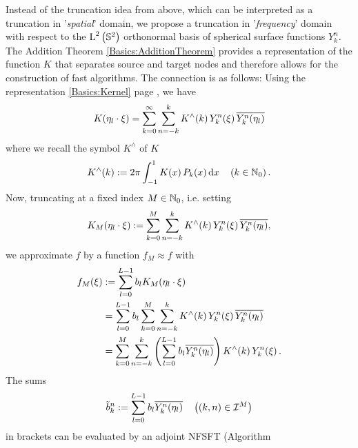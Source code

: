 Instead of the truncation idea from above, which can be interpreted as a truncation in 
'\emph{spatial}' domain, we propose a truncation in '\emph{frequency}' domain with respect 
to the $\text{\rm{L}}^{2}\left(\mathbb{S}^2\right)$ orthonormal basis  
of spherical surface functions $Y_{k}^n$. The Addition 
Theorem \ref{Basics:AdditionTheorem} provides a 
representation of the function $K$ that separates source and target nodes and 
therefore allows for the construction of fast algorithms. The connection is as 
follows: Using the representation \eqref{Basics:Kernel} page \pageref{Basics:Kernel}, we have
\begin{equation}
  \label{Applications:KSeries}
  K{\hspace{-0.4ex}}\left(\mathbf{\eta}_{l} \cdot \mathbf{\xi}\right) = \sum_{k=0}^{\infty} \sum_{n=-k}^k 
  K^{\wedge}{\hspace{-0.4ex}}\left(k\right)   Y_{k}^n{\hspace{-0.4ex}}\left(\mathbf{\xi}\right) \overline{Y_{k}^n{\hspace{-0.4ex}}\left(\mathbf{\eta}_{l}\right)}
\end{equation}
where we recall the symbol $K^{\wedge}$ of $K$
\[
  K^{\wedge}{\hspace{-0.4ex}}\left(k\right) := 2 \pi \int_{-1}^{1} K{\hspace{-0.4ex}}\left(x\right) P_{k}{\hspace{-0.4ex}}\left(x\right) \text{\rm{d}} x 
  \quad \left(k \in \mathbb{N}_{0}\right).
\]
Now, truncating at a fixed index $M \in \mathbb{N}_{0}$, i.e. setting
\begin{equation}
  \label{Applications:TruncatedSeries}
  K_{M}{\hspace{-0.4ex}}\left(\mathbf{\eta}_{l} \cdot \mathbf{\xi}\right) := 
  \sum_{k=0}^{M} \sum_{n=-k}^k K^{\wedge}{\hspace{-0.4ex}}\left(k\right) Y_{k}^n{\hspace{-0.4ex}}\left(\mathbf{\xi}\right) \overline{Y_{k}^n{\hspace{-0.4ex}}\left(\mathbf{\eta}_{l}\right)},
\end{equation}
we approximate $f$ by a function $f_{M} \approx f$ with
\begin{equation}
  \nonumber
  \begin{split}
    f_{M}{\hspace{-0.4ex}}\left(\xi\right) & := \sum_{l = 0}^{L-1} b_{l} K_{M}{\hspace{-0.4ex}}\left(\mathbf{\eta}_{l} \cdot \mathbf{\xi}\right) \\
                 &       = \sum_{l = 0}^{L-1} b_{l} \sum_{k=0}^{M} \sum_{n=-k}^k K^{\wedge}{\hspace{-0.4ex}}\left(k\right)
                           Y_{k}^n{\hspace{-0.4ex}}\left(\mathbf{\xi}\right) \overline{Y_{k}^n{\hspace{-0.4ex}}\left(\mathbf{\eta}_{l}\right)} \\
                 &       = \sum_{k=0}^{M} \sum_{n=-k}^k \left(\sum_{l = 0}^{L-1} b_{l}
                           \overline{Y_{k}^n{\hspace{-0.4ex}}\left(\mathbf{\eta}_{l}\right)}\right) K^{\wedge}{\hspace{-0.4ex}}\left(k\right) Y_{k}^n{\hspace{-0.4ex}}\left(\mathbf{\xi}\right).
  \end{split}                           
\end{equation}
The sums
\begin{equation}
\label{Applications:AdjointNDSFT}
  \tilde{b}_{k}^n := \sum_{l = 0}^{L-1} b_{l} \overline{Y_{k}^n{\hspace{-0.4ex}}\left(\mathbf{\eta}_{l}\right)} \quad \left((k,n) \in \mathcal{I}^M\right)
\end{equation}
in brackets can be evaluated by an adjoint NFSFT (Algorithm 
